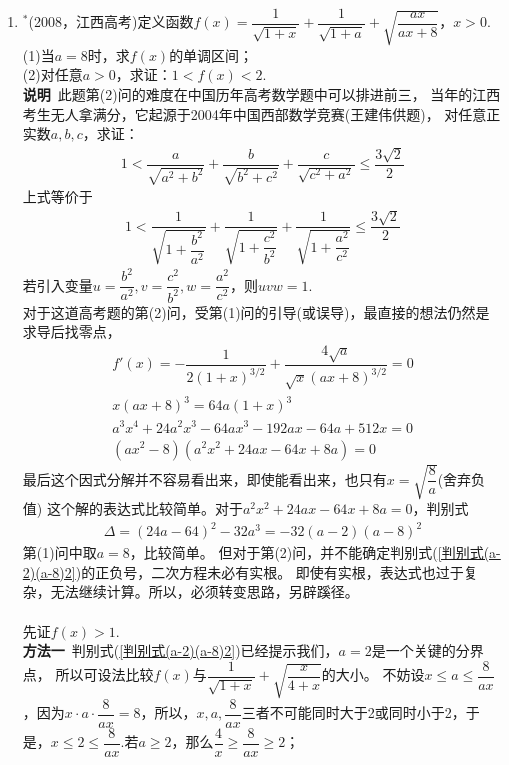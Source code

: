 \begin{enumerate}[label={【\textbf{例\thechapter.\arabic*}】},
 leftmargin=\inteval{\myenumleftmargin}pt,
 itemsep=\inteval{\myenumitempsep}pt,
 itemindent=\inteval{\myenumitemindent}pt]
\item $ ^* $(2008，江西高考)定义函数$ f(x)=\dfrac{1}{\sqrt{1+x}}+
\dfrac{1}{\sqrt{1+a}}+\sqrt{\dfrac{ax}{ax+8}} $，$ x>0 $. \\
(1)当$ a=8 $时，求$ f(x) $的单调区间；\\
(2)对任意$ a>0 $，求证：$ 1<f(x)<2 $. \\
\textbf{说明}\ 此题第(2)问的难度在中国历年高考数学题中可以排进前三，
当年的江西考生无人拿满分，它起源于2004年中国西部数学竞赛(王建伟供题)，
对任意正实数$ a,b,c $，求证：
\begin{gather*}
    1<\dfrac{a}{\sqrt{a^2+b^2}}+\dfrac{b}{\sqrt{b^2+c^2}}+
    \dfrac{c}{\sqrt{c^2+a^2}}\leq \dfrac{3\sqrt{2}}{2} 
\end{gather*}
上式等价于
\begin{gather*}
    1<\dfrac{1}{\sqrt{1+\dfrac{b^2}{a^2}}}+\dfrac{1}{\sqrt{1+\dfrac{c^2}{b^2}}}+
    \dfrac{1}{\sqrt{1+\dfrac{a^2}{c^2}}}\leq \dfrac{3\sqrt{2}}{2} 
\end{gather*}
若引入变量$ u=\dfrac{b^2}{a^2},v=\dfrac{c^2}{b^2},w=\dfrac{a^2}{c^2} $，则$ uvw=1 $.\\
对于这道高考题的第(2)问，受第(1)问的引导(或误导)，最直接的想法仍然是求导后找零点，
\begin{gather*}
    f'(x)=-\dfrac{1}{2(1+x)^{3/2}}+\dfrac{4\sqrt{a}}{\sqrt{x}(ax+8)^{3/2}}=0 \\
    x(ax+8)^3=64a(1+x)^3 \\
    a^3x^4+24a^2x^3-64ax^3-192ax-64a+512x=0\\
    (ax^2-8)(a^2x^2+24ax-64x+8a)=0
\end{gather*}
最后这个因式分解并不容易看出来，即使能看出来，也只有$ x=\sqrt{\dfrac{8}{a}} $(舍弃负值)
这个解的表达式比较简单。对于$ a^2x^2+24ax-64x+8a=0 $，判别式
\begin{align}\label{判别式(a-2)(a-8)2}
    \Delta=(24a-64)^2-32a^3=-32(a-2)(a-8)^2
\end{align}
第(1)问中取$ a=8 $，比较简单。
但对于第(2)问，并不能确定判别式(\ref{判别式(a-2)(a-8)2})的正负号，二次方程未必有实根。
即使有实根，表达式也过于复杂，无法继续计算。所以，必须转变思路，另辟蹊径。\\
\\
先证$ f(x)>1 $. \\
\textbf{方法一}\ 判别式(\ref{判别式(a-2)(a-8)2})已经提示我们，$ a=2 $是一个关键的分界点，
所以可设法比较$ f(x) $与$ \dfrac{1}{\sqrt{1+x}}+\sqrt{\dfrac{x}{4+x}} $的大小。
不妨设$ x\leq a\leq \dfrac{8}{ax} $，因为$ x\cdot a\cdot\dfrac{8}{ax}
=8 $，所以，$ x,a,\dfrac{8}{ax} $三者不可能同时大于2或同时小于2，于是，$ x\leq 2\leq \dfrac{8}{ax} $.若$ a\geq 2 $，那么$ \dfrac{4}{x}\geq \dfrac{8}{ax}\geq 2 $；

\end{enumerate}
